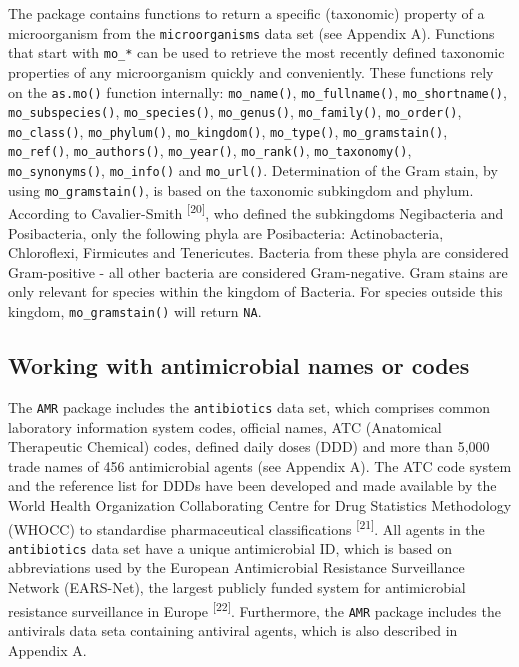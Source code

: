\documentclass[
]{book}
\begin{document}
The package contains functions to return a specific (taxonomic) property of a microorganism from the \texttt{microorganisms} data set (see Appendix A). Functions that start with \texttt{mo\_*} can be used to retrieve the most recently defined taxonomic properties of any microorganism quickly and conveniently. These functions rely on the \texttt{as.mo()} function internally: \texttt{mo\_name()}, \texttt{mo\_fullname()}, \texttt{mo\_shortname()}, \texttt{mo\_subspecies()}, \texttt{mo\_species()}, \texttt{mo\_genus()}, \texttt{mo\_family()}, \texttt{mo\_order()}, \texttt{mo\_class()}, \texttt{mo\_phylum()}, \texttt{mo\_kingdom()}, \texttt{mo\_type()}, \texttt{mo\_gramstain()}, \texttt{mo\_ref()}, \texttt{mo\_authors()}, \texttt{mo\_year()}, \texttt{mo\_rank()}, \texttt{mo\_taxonomy()}, \texttt{mo\_synonyms()}, \texttt{mo\_info()} and \texttt{mo\_url()}. Determination of the Gram stain, by using \texttt{mo\_gramstain()}, is based on the taxonomic subkingdom and phylum. According to Cavalier-Smith \textsuperscript{{[}20{]}}, who defined the subkingdoms Negibacteria and Posibacteria, only the following phyla are Posibacteria: Actinobacteria, Chloroflexi, Firmicutes and Tenericutes. Bacteria from these phyla are considered Gram-positive - all other bacteria are considered Gram-negative. Gram stains are only relevant for species within the kingdom of Bacteria. For species outside this kingdom, \texttt{mo\_gramstain()} will return \texttt{NA}.

\hypertarget{working-with-antimicrobial-names-or-codes}{%
\subsection{Working with antimicrobial names or codes}\label{working-with-antimicrobial-names-or-codes}}

The \texttt{AMR} package includes the \texttt{antibiotics} data set, which comprises common laboratory information system codes, official names, ATC (Anatomical Therapeutic Chemical) codes, defined daily doses (DDD) and more than 5,000 trade names of 456 antimicrobial agents (see Appendix A). The ATC code system and the reference list for DDDs have been developed and made available by the World Health Organization Collaborating Centre for Drug Statistics Methodology (WHOCC) to standardise pharmaceutical classifications \textsuperscript{{[}21{]}}. All agents in the \texttt{antibiotics} data set have a unique antimicrobial ID, which is based on abbreviations used by the European Antimicrobial Resistance Surveillance Network (EARS-Net), the largest publicly funded system for antimicrobial resistance surveillance in Europe \textsuperscript{{[}22{]}}. Furthermore, the \texttt{AMR} package includes the antivirals data seta containing antiviral agents, which is also described in Appendix A.
\end{document}
